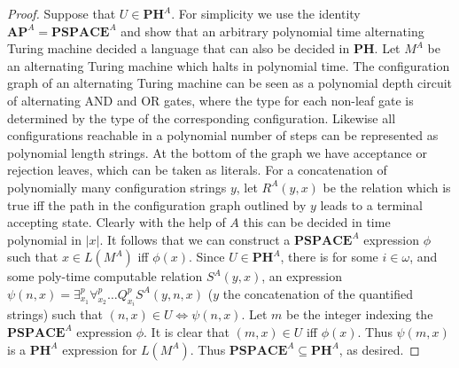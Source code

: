 \begin{proof}
	Suppose that $U \in \bm{PH}^A$. For simplicity we use the identity $\bm{AP}^A = \bm{PSPACE}^A$ and show that an arbitrary polynomial time alternating Turing machine decided a language that can also be decided in $\bm{PH}$. Let $M^A$ be an alternating Turing machine which halts in polynomial time. The configuration graph of an alternating Turing machine can be seen as a polynomial depth circuit of alternating AND and OR gates, where the type for each non-leaf gate is determined by the type of the corresponding configuration. Likewise all configurations reachable in a polynomial number of steps can be represented as polynomial length strings. At the bottom of the graph we have acceptance or rejection leaves, which can be taken as literals. For a concatenation of polynomially many configuration strings $y$, let $R^A(y,x)$ be the relation which is true iff the path in the configuration graph outlined by $y$ leads to a terminal accepting state. Clearly with the help of $A$ this can be decided in time polynomial in $|x|$. It follows that we can construct a $\bm{PSPACE}^A$ expression $\phi$ such that $x \in L(M^A)$ iff $\phi(x)$. Since $U \in \bm{PH}^A$, there is for some $i \in \omega$, and some poly-time computable relation $S^A(y,x)$, an expression $\psi(n,x) = \exists^p_{x_1} \forall^p_{x_2} \ldots Q^p_{x_i} S^A(y,n,x)$ ($y$ the concatenation of the quantified strings) such that $(n,x) \in U \iff \psi(n,x)$. Let $m$ be the integer indexing the $\bm{PSPACE}^A$ expression $\phi$. It is clear that $(m,x) \in U$ iff $\phi(x)$. Thus $\psi(m,x)$ is a $\bm{PH}^A$ expression for $L(M^A)$. Thus $\bm{PSPACE}^A \subseteq \bm{PH}^A$, as desired. \par 
	
\end{proof}

